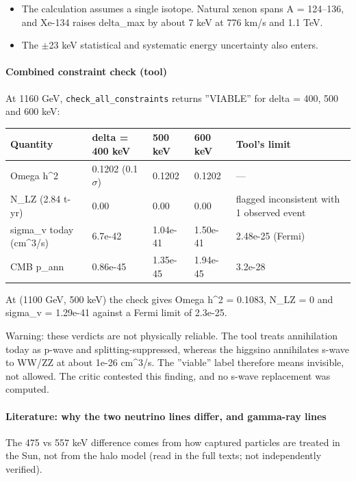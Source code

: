 \documentclass[11pt,a4paper]{article}
\begin{document}
\begin{itemize}
  \item The calculation assumes a single isotope. Natural xenon spans A = 124--136, and Xe-134 raises delta\_max by about 7 keV at 776 km/s and 1.1 TeV.
  \item The $\pm$23 keV statistical and systematic energy uncertainty also enters.
\end{itemize}
\paragraph{Combined constraint check (tool)}
At 1160 GeV, \texttt{check\_\allowbreak{}all\_\allowbreak{}constraints} returns ''VIABLE'' for delta = 400, 500 and 600 keV:

\begin{longtable}{@{}p{}p{}p{}p{}p{}@{}}
\toprule
\textbf{Quantity} & \textbf{delta = 400 keV} & \textbf{500 keV} & \textbf{600 keV} & \textbf{Tool's limit} \\ \midrule \endhead
Omega h\textasciicircum{}2 & 0.1202 (0.1$\sigma$) & 0.1202 & 0.1202 & --- \\
N\_LZ (2.84 t-yr) & 0.00 & 0.00 & 0.00 & flagged inconsistent with 1 observed event \\
sigma\_v today (cm\textasciicircum{}3/s) & 6.7e-42 & 1.04e-41 & 1.50e-41 & 2.48e-25 (Fermi) \\
CMB p\_ann & 0.86e-45 & 1.35e-45 & 1.94e-45 & 3.2e-28 \\
\bottomrule\end{longtable}
At (1100 GeV, 500 keV) the check gives Omega h\textasciicircum{}2 = 0.1083, N\_LZ = 0 and sigma\_v = 1.29e-41 against a Fermi limit of 2.3e-25.

Warning: these verdicts are not physically reliable. The tool treats annihilation today as p-wave and splitting-suppressed, whereas the higgsino annihilates s-wave to WW/ZZ at about 1e-26 cm\textasciicircum{}3/s. The ''viable'' label therefore means invisible, not allowed. The critic contested this finding, and no s-wave replacement was computed.

\paragraph{Literature: why the two neutrino lines differ, and gamma-ray lines}
The 475 vs 557 keV difference comes from how captured particles are treated in the Sun, not from the halo model (read in the full texts; not independently verified).
\end{document}
